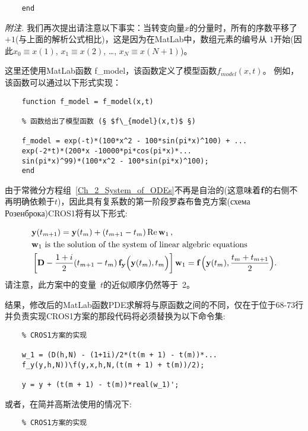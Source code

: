 \documentclass[twoside]{book}
\def\textbf{\bf}%
\begin{document}
\begin{CJK*}{GBK}{song}
\begin{lstlisting}
	end
\end{lstlisting}

	
	\emph{附注.} 我们再次提出请注意以下事实：当转变向量$x$的分量时，所有的序数平移了$+1$(与上面的解析公式相比)，这是因为在MatLab中，数组元素的编号从 $1$开始(因此$x_0 \equiv x(1)$, $x_1 \equiv x(2)$, \ldots, $x_N \equiv x(N + 1)$)。
	
	这里还使用MatLab函数 f\_model，该函数定义了模型函数$f_{model}(x,t)$。 例如，该函数可以通过以下形式实现：
	\begin{lstlisting}
	function f_model = f_model(x,t)
	
	% 函数给出了模型函数 (§ $f\_{model}(x,t)$ §)
	
	f_model = exp(-t)*(100*x^2 - 100*sin(pi*x)^100) + ...
	exp(-2*t)*(200*x -10000*pi*cos(pi*x)*...
	sin(pi*x)^99)*(100*x^2 - 100*sin(pi*x)^100);
	end
	\end{lstlisting}
	
	由于常微分方程组~\eqref{Ch_2_System_of_ODEs}不再是自治的(这意味着$\emph{\textbf{f}}$的右侧不再明确依赖于$t$)，因此具有复系数的第一阶段罗森布鲁克方案(схема Розенброка)CROS1将有以下形式:

	\begin{equation*}
	\begin{aligned}
	&\emph{\textbf{y}}(t_{m + 1}) = \emph{\textbf{y}}(t_m) + (t_{m + 1} - t_m) \, \mathrm{Re} \, \emph{\textbf{w}}_1 \, ,\\
	&\mbox{$\emph{\textbf{w}}_1$ is the solution of the system of linear algebric equations} \\
	&\left[\emph{\textbf{D}} - \dfrac{1 + i}{2} (t_{m + 1} - t_m) \, \emph{\textbf{f}}_\emph{\textbf{y}}\Big(\emph{\textbf{y}}(t_m),t_m\Big)\right] \emph{\textbf{w}}_1 = \emph{\textbf{f}} \, \Big(\emph{\textbf{y}}(t_m),\frac{t_m + t_{m + 1}}{2}\Big).
	\end{aligned}
	\end{equation*}
	请注意，此方案中的变量~$t$的近似顺序仍然等于~2。

	
	结果，修改后的MatLab函数PDE求解将与原函数之间的不同，仅在于位于68-73行并负责实现CROS1方案的那段代码将必须替换为以下命令集:
	\begin{lstlisting}
	% CROS1方案的实现
	
	w_1 = (D(h,N) - (1+1i)/2*(t(m + 1) - t(m))*...
	f_y(y,h,N))\f(y,x,h,N,(t(m + 1) + t(m))/2);
	
	y = y + (t(m + 1) - t(m))*real(w_1)';
	\end{lstlisting}

	或者，在简并高斯法使用的情况下:
\newpage
	\begin{lstlisting}
	% CROS1方案的实现
	

\end{lstlisting}
\end{CJK*}
\end{document}
